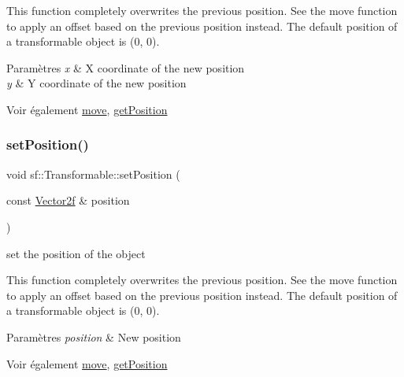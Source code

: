 This function completely overwrites the previous position. See the move function to apply an offset based on the previous position instead. The default position of a transformable object is (0, 0).


\begin{DoxyParams}{Paramètres}
{\em x} & X coordinate of the new position \\
\hline
{\em y} & Y coordinate of the new position\\
\hline
\end{DoxyParams}
\begin{DoxySeeAlso}{Voir également}
\hyperlink{classsf_1_1Transformable_a86b461d6a941ad390c2ad8b6a4a20391}{move}, \hyperlink{classsf_1_1Transformable_a73f9739bc6e74db2cea154bc8e94ec46}{get\+Position} 
\end{DoxySeeAlso}
\mbox{\label{classsf_1_1Transformable_af1a42209ce2b5d3f07b00f917bcd8015}} 
\subsubsection{\texorpdfstring{set\+Position()}{setPosition()}\hspace{0.1cm}{\footnotesize\ttfamily [2/2]}}
{\footnotesize\ttfamily void sf\+::\+Transformable\+::set\+Position (\begin{DoxyParamCaption}\item[{const \hyperlink{classsf_1_1Vector2}{Vector2f} \&}]{position }\end{DoxyParamCaption})}



set the position of the object 

This function completely overwrites the previous position. See the move function to apply an offset based on the previous position instead. The default position of a transformable object is (0, 0).


\begin{DoxyParams}{Paramètres}
{\em position} & New position\\
\hline
\end{DoxyParams}
\begin{DoxySeeAlso}{Voir également}
\hyperlink{classsf_1_1Transformable_a86b461d6a941ad390c2ad8b6a4a20391}{move}, \hyperlink{classsf_1_1Transformable_a73f9739bc6e74db2cea154bc8e94ec46}{get\+Position} 
\end{DoxySeeAlso}
\mbox{\label{classsf_1_1Transformable_a32baf2bf1a74699b03bf8c95030a38ed}} 
